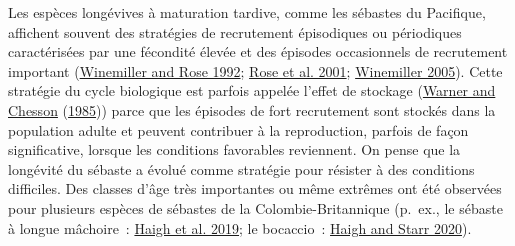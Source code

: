 \documentclass[11pt]{book}
\begin{document}
Les espèces longévives à maturation tardive, comme les sébastes du Pacifique, affichent souvent des stratégies de recrutement épisodiques ou périodiques caractérisées par une fécondité élevée et des épisodes occasionnels de recrutement important (\protect\hyperlink{ref-winemiller1992}{Winemiller and Rose 1992}; \protect\hyperlink{ref-rose2001}{Rose et al. 2001}; \protect\hyperlink{ref-winemiller2005}{Winemiller 2005}). Cette stratégie du cycle biologique est parfois appelée l'effet de stockage (\protect\hyperlink{ref-warner1985}{Warner and Chesson} (\protect\hyperlink{ref-warner1985}{1985})) parce que les épisodes de fort recrutement sont stockés dans la population adulte et peuvent contribuer à la reproduction, parfois de façon significative, lorsque les conditions favorables reviennent. On pense que la longévité du sébaste a évolué comme stratégie pour résister à des conditions difficiles. Des classes d'âge très importantes ou même extrêmes ont été observées pour plusieurs espèces de sébastes de la Colombie-Britannique (p.~ex., le sébaste à longue mâchoire~: \protect\hyperlink{ref-haigh2019}{Haigh et al. 2019}; le bocaccio~: \protect\hyperlink{ref-haigh2020}{Haigh and Starr 2020}).
\end{document}
